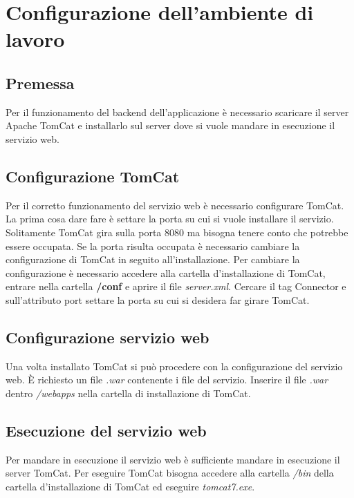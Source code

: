 \section[Configurazione del server]{Configurazione dell'ambiente di lavoro}
\label{settings}

	\subsection{Premessa}
	
		Per il funzionamento del backend dell'applicazione è necessario scaricare il server Apache TomCat e installarlo sul server dove si vuole mandare in esecuzione il servizio web. 
		
	\subsection{Configurazione TomCat}
	
		Per il corretto funzionamento del servizio web è necessario configurare TomCat. La prima cosa dare fare è settare la porta su cui si vuole installare il servizio. Solitamente TomCat gira sulla porta 8080 ma bisogna tenere conto che potrebbe essere occupata. Se la porta risulta occupata è necessario cambiare la configurazione di TomCat in seguito all'installazione. Per cambiare la configurazione è  necessario accedere alla cartella d'installazione di TomCat, entrare nella cartella \textbf{/conf} e aprire il file \textit{server.xml}. Cercare il tag Connector e sull'attributo port settare la porta su cui si desidera far girare TomCat.
		
	\subsection{Configurazione servizio web}
	
		Una volta installato TomCat si può procedere con la configurazione del servizio web. È richiesto un file \textit{.war} contenente i file del servizio. Inserire il file \textit{.war} dentro \textit{/webapps} nella cartella di installazione di TomCat.
		
	\subsection{Esecuzione del servizio web}
	
		Per mandare in esecuzione il servizio web è sufficiente mandare in esecuzione il server TomCat. Per eseguire TomCat bisogna accedere alla cartella \textit{/bin} della cartella d'installazione di TomCat ed eseguire \textit{tomcat7.exe}. 
		
